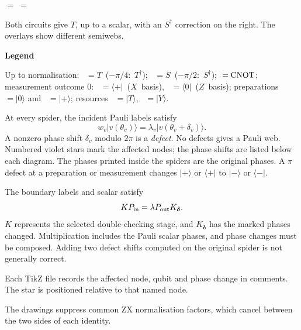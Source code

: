 \documentclass[11pt]{article}
\begin{document}
\begin{semiwebaddition}
\begin{minipage}[t]{.49\linewidth}
\begin{center}
%
\hfill${}={}$\hfill
{}%
\hfill${}={}$\hfill
{}
\end{center}
Both circuits give $T$, up to a scalar, with an $S^\dagger$ correction on
the right. The overlays show different semiwebs.

\textbf{Legend}\quad
{}

Up to normalisation:
\mbox{ ${}=T$ ($-\pi/4$: $T^\dagger$)};
\mbox{ ${}=S$ ($-\pi/2$: $S^\dagger$)};
\mbox{\semiwebCaptionCnot ${}={\rm CNOT}$};
measurement outcome $0$: \mbox{ ${}=\langle+|$ ($X$ basis)},
\mbox{ ${}=\langle0|$ ($Z$ basis)};
preparations \mbox{ ${}=|0\rangle$}
and \mbox{ ${}=|+\rangle$};
resources \mbox{ ${}=|T\rangle$},
\mbox{ ${}=|Y\rangle$}.

At every spider, the incident Pauli labels satisfy
\[
 w_v|v(\theta_v)\rangle
 =\lambda_v|v(\theta_v+\delta_v)\rangle.
\]
A nonzero phase shift $\delta_v$ modulo $2\pi$ is a \emph{defect}.
No defects gives a Pauli web. Numbered violet stars mark the affected
nodes; the phase shifts are listed below each diagram. The phases
printed inside the spiders are the original phases.
A $\pi$ defect at a preparation or measurement changes
$|+\rangle$ or $\langle+|$ to $|-\rangle$ or $\langle-|$.

The boundary labels and scalar satisfy
\[
 K P_{\rm in}=\lambda P_{\rm out}K_{\boldsymbol\delta}.
\]
$K$ represents the selected double-checking stage, and $K_{\boldsymbol\delta}$
has the marked phases changed. Multiplication includes the Pauli scalar
phases, and phase changes must be composed. Adding two defect shifts
computed on the original spider is not generally correct.

Each TikZ file records the affected node, qubit and phase change in
comments. The star is positioned relative to that named node.

\end{minipage}
\vfill
\small The drawings suppress common ZX normalisation factors, which cancel between the two sides of each identity.
\newpage

\end{semiwebaddition}
\end{document}
